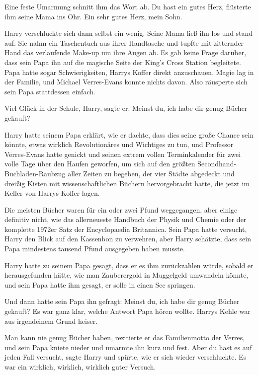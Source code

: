 Eine feste Umarmung schnitt ihm das Wort ab. \glqq{}Du hast ein gutes
Herz\grqq{}, flüsterte ihm seine Mama ins Ohr. \glqq{}Ein sehr gutes Herz,
mein Sohn.\grqq{}

Harry verschluckte sich dann selbst ein wenig. Seine Mama ließ ihn los und
stand auf. Sie nahm ein Taschentuch aus ihrer Handtasche und tupfte mit
zitternder Hand das verlaufende Make-up um ihre Augen ab. Es gab keine Frage
darüber, dass sein Papa ihn auf die magische Seite der King's Cross Station
begleitete. Papa hatte sogar Schwierigkeiten, Harrys Koffer direkt anzuschauen.
Magie lag in der Familie, und Michael Verres-Evans konnte nichts davon. Also
räusperte sich sein Papa stattdessen einfach.

\glqq{}Viel Glück in der Schule, Harry\grqq{}, sagte er. \glqq{}Meinst du, ich
habe dir genug Bücher gekauft?\grqq{}

Harry hatte seinem Papa erklärt, wie er dachte, dass dies seine große Chance
sein könnte, etwas wirklich Revolutionäres und Wichtiges zu tun, und Professor
Verres-Evans hatte genickt und seinen extrem vollen Terminkalender für zwei
volle Tage über den Haufen geworfen, um sich auf den größten
Secondhand-Buchladen-Raubzug aller Zeiten zu begeben, der vier Städte abgedeckt
und dreißig Kisten mit wissenschaftlichen Büchern hervorgebracht hatte, die
jetzt im Keller von Harrys Koffer lagen.

Die meisten Bücher waren für ein oder zwei Pfund weggegangen, aber einige
definitiv nicht, wie das allerneueste \glqq{}Handbuch der Physik und
Chemie\grqq{} oder der komplette 1972er Satz der \glqq{}Encyclopaedia
Britannica\grqq{}. Sein Papa hatte versucht, Harry den Blick auf den Kassenbon
zu verwehren, aber Harry schätzte, dass sein Papa mindestens tausend Pfund
ausgegeben haben musste.

Harry hatte zu seinem Papa gesagt, dass er es ihm zurückzahlen würde, sobald er
herausgefunden hätte, wie man Zauberergold in Muggelgeld umwandeln könnte, und
sein Papa hatte ihm gesagt, er solle in einen See springen.

Und dann hatte sein Papa ihn gefragt: Meinst du, ich habe dir genug Bücher
gekauft? Es war ganz klar, welche Antwort Papa hören wollte. Harrys Kehle war aus
irgendeinem Grund heiser.

\glqq{}Man kann nie genug Bücher haben\grqq{}, rezitierte er das Familienmotto
der Verres, und sein Papa kniete nieder und umarmte ihn kurz und fest. \glqq{}
Aber du hast es auf jeden Fall versucht\grqq{}, sagte Harry und spürte, wie er
sich wieder verschluckte. \glqq{}Es war ein wirklich, wirklich, wirklich guter
Versuch.\grqq{}

